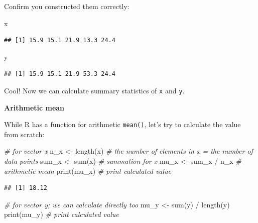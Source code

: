 \documentclass[
]{book}
\newenvironment{Shaded}{\begin{snugshade}}{\end{snugshade}}
\newcommand{\CommentTok}[1]{\textcolor[rgb]{0.56,0.35,0.01}{\textit{#1}}}
\newcommand{\FunctionTok}[1]{\textcolor[rgb]{0.00,0.00,0.00}{#1}}
\newcommand{\NormalTok}[1]{#1}
\newcommand{\OtherTok}[1]{\textcolor[rgb]{0.56,0.35,0.01}{#1}}
\newcommand{\SpecialCharTok}[1]{\textcolor[rgb]{0.00,0.00,0.00}{#1}}
\begin{document}
Confirm you constructed them correctly:

\begin{Shaded}
\begin{Highlighting}[]
\NormalTok{x}
\end{Highlighting}
\end{Shaded}

\begin{verbatim}
## [1] 15.9 15.1 21.9 13.3 24.4
\end{verbatim}

\begin{Shaded}
\begin{Highlighting}[]
\NormalTok{y}
\end{Highlighting}
\end{Shaded}

\begin{verbatim}
## [1] 15.9 15.1 21.9 53.3 24.4
\end{verbatim}

Cool! Now we can calculate summary statistics of \texttt{x} and \texttt{y}.

\textbf{Arithmetic mean}

While R has a function for arithmetic \texttt{mean()}, let's try to calculate the value from scratch:

\begin{Shaded}
\begin{Highlighting}[]
\CommentTok{\# for vector x}
\NormalTok{n\_x }\OtherTok{\textless{}{-}} \FunctionTok{length}\NormalTok{(x) }\CommentTok{\# the number of elements in x = the number of data points}
\NormalTok{sum\_x }\OtherTok{\textless{}{-}} \FunctionTok{sum}\NormalTok{(x) }\CommentTok{\# summation for x}
\NormalTok{mu\_x }\OtherTok{\textless{}{-}}\NormalTok{ sum\_x }\SpecialCharTok{/}\NormalTok{ n\_x }\CommentTok{\# arithmetic mean}
\FunctionTok{print}\NormalTok{(mu\_x) }\CommentTok{\# print calculated value}
\end{Highlighting}
\end{Shaded}

\begin{verbatim}
## [1] 18.12
\end{verbatim}

\begin{Shaded}
\begin{Highlighting}[]
\CommentTok{\# for vector y; we can calculate directly too}
\NormalTok{mu\_y }\OtherTok{\textless{}{-}} \FunctionTok{sum}\NormalTok{(y) }\SpecialCharTok{/} \FunctionTok{length}\NormalTok{(y)}
\FunctionTok{print}\NormalTok{(mu\_y) }\CommentTok{\# print calculated value}
\end{Highlighting}
\end{Shaded}
\end{document}
